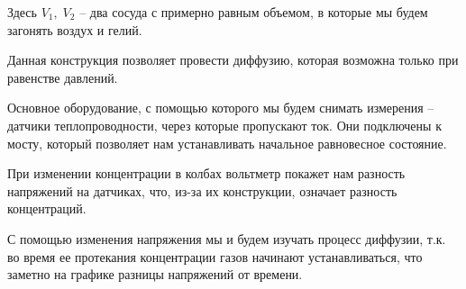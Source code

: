 \documentclass[a4paper,12pt]{article} %
\begin{document}
Здесь $V_1,\; V_2$ -- два сосуда с примерно равным объемом, в которые мы будем загонять воздух и гелий.

Данная конструкция позволяет провести диффузию, которая возможна только при равенстве давлений.

Основное оборудование, с помощью которого мы будем снимать измерения -- датчики теплопроводности, через которые пропускают ток. Они подключены к мосту, который позволяет нам устанавливать начальное равновесное состояние.

При изменении концентрации в колбах вольтметр покажет нам разность напряжений на датчиках, что, из-за их конструкции, означает разность концентраций. 

С помощью изменения напряжения мы и будем изучать процесс диффузии, т.к. во время ее протекания концентрации газов начинают устанавливаться, что заметно на графике разницы напряжений от времени.



\end{document}
